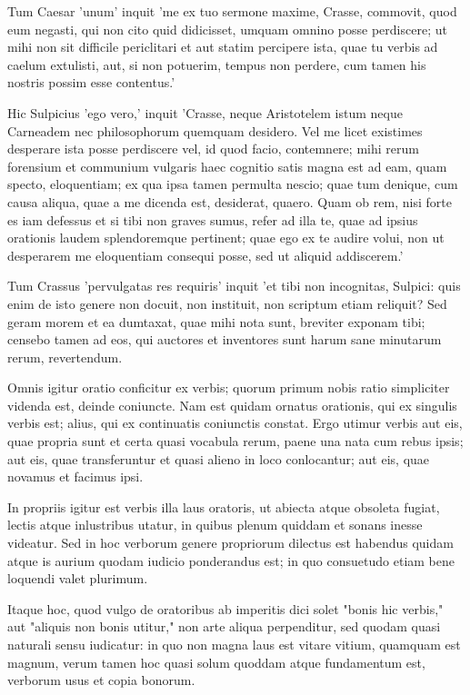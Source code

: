  Tum Caesar 'unum' inquit 'me ex tuo sermone maxime, Crasse, commovit, quod eum negasti, qui non cito quid didicisset, umquam omnino posse perdiscere; ut mihi non sit difficile periclitari et aut statim percipere ista, quae tu verbis ad caelum extulisti, aut, si non potuerim, tempus non perdere, cum tamen his nostris possim esse contentus.'

 Hic Sulpicius 'ego vero,' inquit 'Crasse, neque Aristotelem istum neque Carneadem nec philosophorum quemquam desidero. Vel me licet existimes desperare ista posse perdiscere vel, id quod facio, contemnere; mihi rerum forensium et communium vulgaris haec cognitio satis magna est ad eam, quam specto, eloquentiam; ex qua ipsa tamen permulta nescio; quae tum denique, cum causa aliqua, quae a me dicenda est, desiderat, quaero. Quam ob rem, nisi forte es iam defessus et si tibi non graves sumus, refer ad illa te, quae ad ipsius orationis laudem splendoremque pertinent; quae ego ex te audire volui, non ut desperarem me eloquentiam consequi posse, sed ut aliquid addiscerem.'

 Tum Crassus 'pervulgatas res requiris' inquit 'et tibi non incognitas, Sulpici: quis enim de isto genere non docuit, non instituit, non scriptum etiam reliquit? Sed geram morem et ea dumtaxat, quae mihi nota sunt, breviter exponam tibi; censebo tamen ad eos, qui auctores et inventores sunt harum sane minutarum rerum, revertendum.

 Omnis igitur oratio conficitur ex verbis; quorum primum nobis ratio simpliciter videnda est, deinde coniuncte. Nam est quidam ornatus orationis, qui ex singulis verbis est; alius, qui ex continuatis coniunctis constat. Ergo utimur verbis aut eis, quae propria sunt et certa quasi vocabula rerum, paene una nata cum rebus ipsis; aut eis, quae transferuntur et quasi alieno in loco conlocantur; aut eis, quae novamus et facimus ipsi.

 In propriis igitur est verbis illa laus oratoris, ut abiecta atque obsoleta fugiat, lectis atque inlustribus utatur, in quibus plenum quiddam et sonans inesse videatur. Sed in hoc verborum genere propriorum dilectus est habendus quidam atque is aurium quodam iudicio ponderandus est; in quo consuetudo etiam bene loquendi valet plurimum.

 Itaque hoc, quod vulgo de oratoribus ab imperitis dici solet "bonis hic verbis," aut "aliquis non bonis utitur," non arte aliqua perpenditur, sed quodam quasi naturali sensu iudicatur: in quo non magna laus est vitare vitium, quamquam est magnum, verum tamen hoc quasi solum quoddam atque fundamentum est, verborum usus et copia bonorum.

